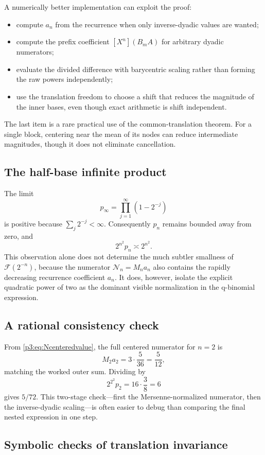 \documentclass[11pt,oneside]{article}
\theoremstyle{definition}
\theoremstyle{remark}
\newcommand{\F}{\mathcal F}
\newcommand{\coeff}[2]{\left[#1^{#2}\right]}
\begin{document}
A numerically better implementation can exploit the proof:
\begin{itemize}[leftmargin=2em]
\item compute $a_n$ from the recurrence when only inverse-dyadic values are
wanted;
\item compute the prefix coefficient
$\coeff{X}{n}(B_mA)$ for arbitrary dyadic numerators;
\item evaluate the divided difference with barycentric scaling rather than
forming the raw powers independently;
\item use the translation freedom to choose a shift that reduces the
magnitude of the inner bases, even though exact arithmetic is shift
independent.
\end{itemize}
The last item is a rare practical use of the common-translation theorem.
For a single block, centering near the mean of its nodes can reduce
intermediate magnitudes, though it does not eliminate cancellation.

\subsection{The half-base infinite product}

The limit
\[
 p_\infty=\prod_{j=1}^{\infty}(1-2^{-j})
\]
is positive because $\sum_j2^{-j}<\infty$.  Consequently
$p_n$ remains bounded away from zero, and
\[
 2^{n^2}p_n\asymp2^{n^2}.
\]
This observation alone does not determine the much subtler smallness of
$\F(2^{-n})$, because the numerator $\mathcal N_n=M_na_n$ also contains the
rapidly decreasing recurrence coefficient $a_n$.  It does, however, isolate
the explicit quadratic power of two as the dominant visible normalization
in the q-binomial expression.

\subsection{A rational consistency check}

From \eqref{p3:eq:Ncenteredvalue}, the full centered numerator for $n=2$ is
\[
 M_2a_2=3\cdot\frac5{36}=\frac5{12},
\]
matching the worked outer sum.  Dividing by
\[
 2^{2^2}p_2=16\cdot\frac38=6
\]
gives $5/72$.  This two-stage check---first the Mersenne-normalized numerator,
then the inverse-dyadic scaling---is often easier to debug than comparing the
final nested expression in one step.

\subsection{Symbolic checks of translation invariance}
\end{document}
